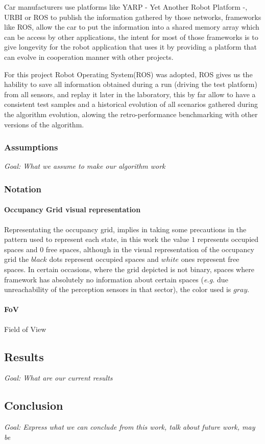 Car manufacturers use platforms like YARP - Yet Another Robot Platform -, URBI or ROS to publish the information gathered by those networks, frameworks like ROS, allow the car to put the information into a shared memory array which can be access by other applications, the intent for most of those frameworks is to give longevity\cite{Fitzpatrick:2008:TLR:1327539.1327705} for the robot application that uses it by providing a platform that can evolve in cooperation manner with other projects.

For this project Robot Operating System(ROS) was adopted, ROS gives us the hability to save all information obtained during a run (driving the test platform) from all sensors, and replay it later in the laboratory, this by far allow to have a consistent test samples and a historical evolution of all scenarios gathered during the algorithm evolution, alowing the retro-performance benchmarking with other versions of the algorithm.

\subsubsection*{Assumptions}

\textit{Goal: What we assume to make our algorithm work}

\subsubsection*{Notation}

\paragraph{Occupancy Grid visual representation}

Representating the occupancy grid, implies in taking some precautions in the pattern used to represent each state, in this work the value $1$ represents occupied spaces and $0$ free spaces, although in the visual representation of the occupancy grid the $black$ dots represent occupied spaces and $white$ ones represent free spaces. In certain occasions, where the grid depicted is not binary, spaces where framework has absolutely no information about certain spaces (\textit{e.g.} due unreachability of the perception sensors in that sector), the color used is $gray$.

\paragraph{FoV} Field of View

\subsection{Results}

\textit{Goal: What are our current results}

\subsection{Conclusion}

\textit{Goal: Express what we can conclude from this work, talk about future work, may be}